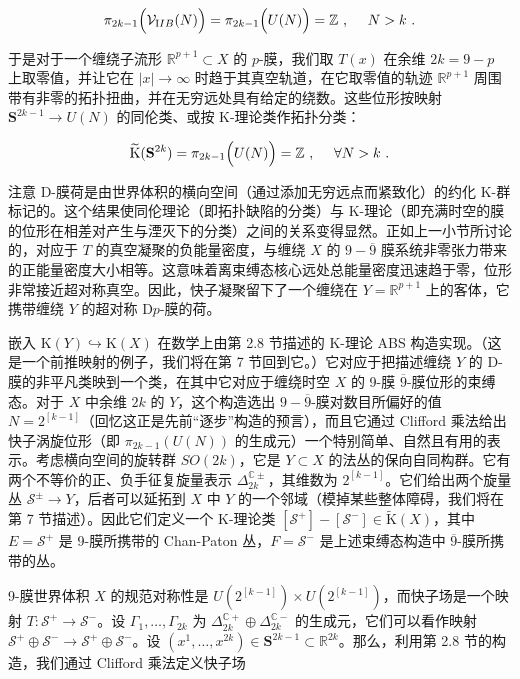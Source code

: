 \documentclass[11pt,a4paper]{ctexart}
\begin{document}
\[\pi_{2k-1}\Bigl({\mathcal V}_{\mathrm IIB}(N)\Bigr)= \pi_{2k-1}\Bigl(U(N)\Bigr)=
{\mathbb{Z}}\ , \ \ \ \ N>k\ .\]

于是对于一个缠绕子流形 \({\mathbb{R}}^{p+1}\subset X\) 的 \(p\)-膜，我们取 \(T(x)\) 在余维 \(2k=9-p\) 上取零值，并让它在 \(|x|\rightarrow \infty\) 时趋于其真空轨道，在它取零值的轨迹 \({\mathbb{R}}^{p+1}\) 周围带有非零的拓扑扭曲，并在无穷远处具有给定的绕数。这些位形按映射 \({\mathbf S}^{2k-1}\rightarrow U(N)\) 的同伦类、或按 K-理论类作拓扑分类：

\[\widetilde{{\mathrm K}}({\mathbf S}^{2k})= \pi_{2k-1}\Bigl(U(N)\Bigr)= {\mathbb{Z}}\ , \ \ \ \
\forall N>k\ .\]

注意 D-膜荷是由世界体积的横向空间（通过添加无穷远点而紧致化）的约化 K-群标记的。这个结果使同伦理论（即拓扑缺陷的分类）与 K-理论（即充满时空的膜的位形在相差对产生与湮灭下的分类）之间的关系变得显然。正如上一小节所讨论的，对应于 \(T\) 的真空凝聚的负能量密度，与缠绕 \(X\) 的 \(9-\overline{9}\) 膜系统非零张力带来的正能量密度大小相等。这意味着离束缚态核心远处总能量密度迅速趋于零，位形非常接近超对称真空。因此，快子凝聚留下了一个缠绕在 \(Y={\mathbb{R}}^{p+1}\) 上的客体，它携带缠绕 \(Y\) 的超对称 D\(p\)-膜的荷。

嵌入 \({\mathrm K}(Y)\hookrightarrow {\mathrm K}(X)\) 在数学上由第 2.8 节描述的 K-理论 ABS 构造实现。（这是一个前推映射的例子，我们将在第 7 节回到它。）它对应于把描述缠绕 \(Y\) 的 D-膜的非平凡类映到一个类，在其中它对应于缠绕时空 \(X\) 的 9-膜 \(\overline{9}\)-膜位形的束缚态。对于 \(X\) 中余维 \(2k\) 的 \(Y\)，这个构造选出 \(9-\overline{9}\)-膜对数目所偏好的值 \(N=2^[k-1]\)（回忆这正是先前``逐步''构造的预言），而且它通过 Clifford 乘法给出快子涡旋位形（即 \(\pi_{2k-1}(U(N))\) 的生成元）一个特别简单、自然且有用的表示。考虑横向空间的旋转群 \(SO(2k)\)，它是 \(Y\subset X\) 的法丛的保向自同构群。它有两个不等价的正、负手征复旋量表示 \(\Delta_{2k}^{{\mathbb{C}}\pm}\)，其维数为 \(2^[k-1]\)。它们给出两个旋量丛 \({\mathcal S}^{\pm}\rightarrow Y\)，后者可以延拓到 \(X\) 中 \(Y\) 的一个邻域（模掉某些整体障碍，我们将在第 7 节描述）。因此它们定义一个 K-理论类 \([{\mathcal S}^+]-[{\mathcal S}^-]\in \widetilde{{\mathrm K}}(X)\)，其中 \(E={\mathcal S}^+\) 是 9-膜所携带的 Chan-Paton 丛，\(F={\mathcal S}^-\) 是上述束缚态构造中 \(\overline{9}\)-膜所携带的丛。

9-膜世界体积 \(X\) 的规范对称性是 \(U(2^[k-1])\times U(2^[k-1])\)，而快子场是一个映射 \(T: {\mathcal S}^+\rightarrow {\mathcal S}^-\)。设 \(\Gamma_1, \ldots , \Gamma_{2k}\) 为 \(\Delta_{2k}^{{\mathbb{C}}+}\oplus\Delta_{2k}^{{\mathbb{C}}-}\) 的生成元，它们可以看作映射 \({\mathcal S}^+\oplus {\mathcal S}^- \rightarrow {\mathcal S}^+\oplus {\mathcal S}^-\)。设 \((x^1,\ldots , x^{2k})\in {\mathbf S}^{2k-1}\subset{\mathbb{R}}^{2k}\)。那么，利用第 2.8 节的构造，我们通过 Clifford 乘法定义快子场
\end{document}
